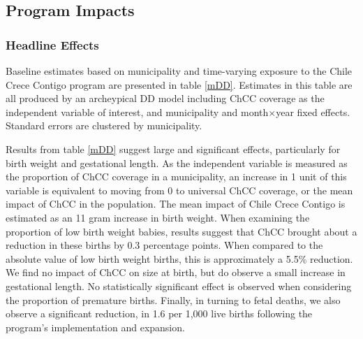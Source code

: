 \documentclass[12pt]{article}
\begin{document}
\begin{spacing}{1.4}
\subsection{Program Impacts}
\subsubsection{Headline Effects}
\label{scn:headline}
Baseline estimates based on municipality and time-varying exposure
to the Chile Crece Contigo program are presented in table \ref{mDD}.
Estimates in this table are all produced by an archeypical DD model
including ChCC coverage as the independent variable of interest, and
municipality and month$\times$year fixed effects.  Standard errors
are clustered by municipality.

Results from table \ref{mDD} suggest large and significant effects,
particularly for birth weight and gestational length.  As the
independent variable is measured as the proportion of ChCC coverage
in a municipality, an increase in 1 unit of this variable is equivalent
to moving from 0 to universal ChCC coverage, or the mean impact of
ChCC in the population. The mean impact of Chile Crece Contigo is
estimated as an 11 gram increase in birth weight.  When examining
the proportion of low birth weight babies, results suggest that
ChCC brought about a reduction in these births by 0.3 percentage
points.  When compared to the absolute value of low birth weight
births, this is approximately a 5.5\% reduction. We find no impact
of ChCC on size at birth, but do observe a small increase in gestational
length. No statistically significant effect is observed when considering
the proportion of premature births.  Finally, in turning to fetal
deaths, we also observe a significant reduction, in 1.6 per 1,000
live births following the program's implementation and expansion.


\end{spacing}
\end{document}
